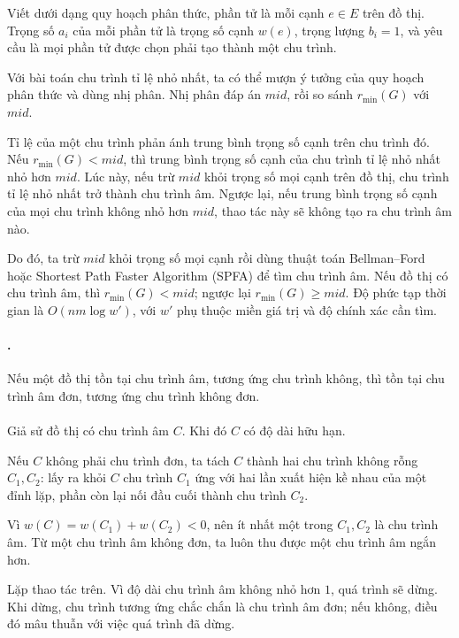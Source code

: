 \documentclass[11pt]{article}
\begin{document}
Viết dưới dạng quy hoạch phân thức, phần tử là mỗi cạnh \(e\in E\) trên đồ thị.
Trọng số \(a_i\) của mỗi phần tử là trọng số cạnh \(w(e)\), trọng lượng
\(b_i=1\), và yêu cầu là mọi phần tử được chọn phải tạo thành một chu trình.

Với bài toán chu trình tỉ lệ nhỏ nhất, ta có thể mượn ý tưởng của quy hoạch
phân thức và dùng nhị phân. Nhị phân đáp án \(\mathit{mid}\), rồi so sánh
\(r_{\min}(G)\) với \(\mathit{mid}\).

Tỉ lệ của một chu trình phản ánh trung bình trọng số cạnh trên chu trình đó.
Nếu \(r_{\min}(G)<\mathit{mid}\), thì trung bình trọng số cạnh của chu trình tỉ
lệ nhỏ nhất nhỏ hơn \(\mathit{mid}\). Lúc này, nếu trừ \(\mathit{mid}\) khỏi
trọng số mọi cạnh trên đồ thị, chu trình tỉ lệ nhỏ nhất trở thành chu trình âm.
Ngược lại, nếu trung bình trọng số cạnh của mọi chu trình không nhỏ hơn
\(\mathit{mid}\), thao tác này sẽ không tạo ra chu trình âm nào.

Do đó, ta trừ \(\mathit{mid}\) khỏi trọng số mọi cạnh rồi dùng thuật toán
Bellman--Ford hoặc Shortest Path Faster Algorithm (SPFA) để tìm chu trình âm.
Nếu đồ thị có chu trình âm, thì \(r_{\min}(G)<\mathit{mid}\); ngược lại
\(r_{\min}(G)\ge\mathit{mid}\). Độ phức tạp thời gian là
\(O(nm\log w')\), với \(w'\) phụ thuộc miền giá trị và độ chính xác cần tìm.

\paragraph{.}
Nếu một đồ thị tồn tại chu trình âm, tương ứng chu trình không, thì tồn tại chu
trình âm đơn, tương ứng chu trình không đơn.

\paragraph{}
Giả sử đồ thị có chu trình âm \(C\). Khi đó \(C\) có độ dài hữu hạn.

Nếu \(C\) không phải chu trình đơn, ta tách \(C\) thành hai chu trình không
rỗng \(C_1,C_2\): lấy ra khỏi \(C\) chu trình \(C_1\) ứng với hai lần xuất hiện
kề nhau của một đỉnh lặp, phần còn lại nối đầu cuối thành chu trình \(C_2\).

Vì \(w(C)=w(C_1)+w(C_2)<0\), nên ít nhất một trong \(C_1,C_2\) là chu trình âm.
Từ một chu trình âm không đơn, ta luôn thu được một chu trình âm ngắn hơn.

Lặp thao tác trên. Vì độ dài chu trình âm không nhỏ hơn \(1\), quá trình sẽ
dừng. Khi dừng, chu trình tương ứng chắc chắn là chu trình âm đơn; nếu không,
điều đó mâu thuẫn với việc quá trình đã dừng.
\end{document}

